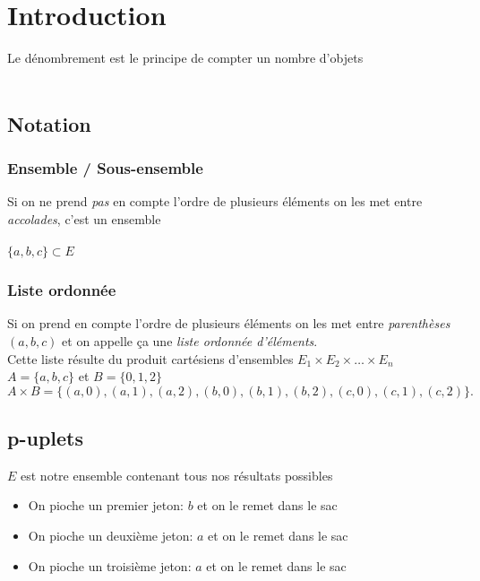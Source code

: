 \chapter{Introduction}
Le dénombrement est le principe de compter un nombre d'objets \\ \\

\section{Notation}
\subsection{Ensemble / Sous-ensemble}
Si on ne prend \emph{pas} en compte l'ordre de plusieurs éléments on les met entre \emph{accolades}, c'est un ensemble \\ \\
$\{a, b, c\} \subset E$

\subsection{Liste ordonnée}
Si on prend en compte l'ordre de plusieurs éléments on les met entre \emph{parenthèses} $(a, b, c)$ et on appelle ça une \emph{liste ordonnée d'éléments}. \\
Cette liste résulte du produit cartésiens d'ensembles $E_1 \times E_2 \times \dots \times E_n$
$A = \{a, b, c\}$ et $B = \{0, 1, 2\}$ \\
$A \times B = \{(a, 0), (a, 1), (a, 2), (b, 0), (b, 1), (b, 2), (c, 0), (c, 1), (c, 2)\}.$

\pagebreak

\section{p-uplets}
$E$ est notre ensemble contenant tous nos résultats possibles

\begin{itemize}
  \item On pioche un premier jeton: $b$ et on le remet dans le sac
  \item On pioche un deuxième jeton: $a$ et on le remet dans le sac
  \item On pioche un troisième jeton: $a$ et on le remet dans le sac \\
\end{itemize}

